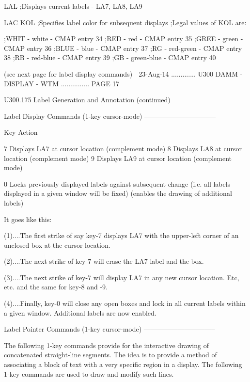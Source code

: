    LAL         ;Displays current labels - LA7, LA8, LA9
 
   LAC  KOL    ;Specifies label color for subsequent displays
               ;Legal values of KOL are:
 
               ;WHIT - white      - CMAP entry 34
               ;RED  - red        - CMAP entry 35
               ;GREE - green      - CMAP entry 36
               ;BLUE - blue       - CMAP entry 37
               ;RG   - red-green  - CMAP entry 38
               ;RB   - red-blue   - CMAP entry 39
               ;GB   - green-blue - CMAP entry 40
 
 
                   (see next page for label display commands)
    
   23-Aug-14 ............. U300  DAMM - DISPLAY - WTM ............... PAGE  17
 
 
 
   U300.175  Label Generation and Annotation (continued)
 
   Label Display Commands (1-key cursor-mode) --------------------------------
 
   Key      Action
 
   7        Displays LA7 at cursor location (complement mode)
   8        Displays LA8 at cursor location (complement mode)
   9        Displays LA9 at cursor location (complement mode)
 
   0        Locks previously displayed labels against subsequent change
            (i.e. all labels displayed in a given window will be fixed)
            (enables the drawing of additional labels)
 
   It goes like this:
 
   (1)....The first strike of say  key-7  displays  LA7  with  the  upper-left
          corner of an unclosed box at the cursor location.
 
   (2)....The next strike of key-7 will erase the LA7 label and the box.
 
   (3)....The  next  strike  of  key-7  will  display  LA7  in  any new cursor
          location. Etc, etc. and the same for key-8 and -9.
 
   (4)....Finally, key-0 will close any open boxes and  lock  in  all  current
          labels within a given window. Additional labels are now enabled.
 
   Label Pointer Commands (1-key cursor-mode) --------------------------------
 
   The  following  1-key  commands  provide  for  the  interactive  drawing of
   concatenated straight-line segments. The idea is to  provide  a  method  of
   associating  a  block of text with a very specific region in a display. The
   following 1-key commands are used to draw and modify such lines.
 

